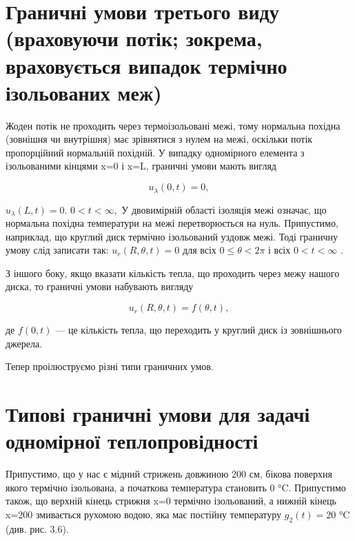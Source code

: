 \documentclass[
  ukrainian,
]{article}
\begin{document}
\section{Граничні умови третього виду (враховуючи потік; зокрема,
враховується випадок термічно ізольованих
меж)}\label{ux433ux440ux430ux43dux438ux447ux43dux456-ux443ux43cux43eux432ux438-ux442ux440ux435ux442ux44cux43eux433ux43e-ux432ux438ux434ux443-ux432ux440ux430ux445ux43eux432ux443ux44eux447ux438-ux43fux43eux442ux456ux43a-ux437ux43eux43aux440ux435ux43cux430-ux432ux440ux430ux445ux43eux432ux443ux454ux442ux44cux441ux44f-ux432ux438ux43fux430ux434ux43eux43a-ux442ux435ux440ux43cux456ux447ux43dux43e-ux456ux437ux43eux43bux44cux43eux432ux430ux43dux438ux445-ux43cux435ux436}

Жоден потік не проходить через термоізольовані межі, тому нормальна
похідна (зовнішня чи внутрішня) має зрівнятися з нулем на межі, оскільки
потік пропорційний нормальній похідній. У випадку одномірного елемента з
ізольованими кінцями x=0 і x=L, граничні умови мають вигляд

\[
u_{\lambda}(0, t) = 0,
\]

\(u_{\lambda}(L, t) = 0.\) \(0 < t < \infty,\) У двовимірній області
ізоляція межі означає, що нормальна похідна температури на межі
перетворюється на нуль. Припустимо, наприклад, що круглий диск термічно
ізольований уздовж межі. Тоді граничну умову слід записати так:
\(u_r(R, \theta, t) = 0\) для всіх \(0 \le \theta < 2\pi\) і всіх
\(0 < t < \infty\) .

З іншого боку, якщо вказати кількість тепла, що проходить через межу
нашого диска, то граничні умови набувають вигляду

\[
u_r(R, \theta, t) = f(\theta, t),
\]

де \(f(0, t)\) --- це кількість тепла, що переходить у круглий диск із
зовнішнього джерела.

Тепер проілюструємо різні типи граничних умов.

\section{Типові граничні умови для задачі одномірної
теплопровідності}\label{ux442ux438ux43fux43eux432ux456-ux433ux440ux430ux43dux438ux447ux43dux456-ux443ux43cux43eux432ux438-ux434ux43bux44f-ux437ux430ux434ux430ux447ux456-ux43eux434ux43dux43eux43cux456ux440ux43dux43eux457-ux442ux435ux43fux43bux43eux43fux440ux43eux432ux456ux434ux43dux43eux441ux442ux456}

Припустимо, що у нас є мідний стрижень довжиною 200 см, бікова поверхня
якого термічно ізольована, а початкова температура становить 0 °C.
Припустимо також, що верхній кінець стрижня x=0 термічно ізольований, а
нижній кінець x=200 змивається рухомою водою, яка має постійну
температуру \(g_2(t)=20\) °C (див. рис. 3.6).
\end{document}

